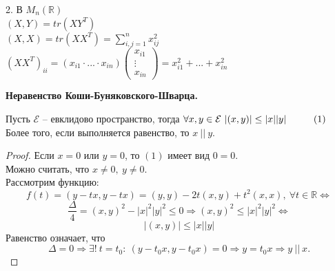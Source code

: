 \documentclass[a4paper, 12pt]{article}
\newcommand\tab[1][.5cm]{\hspace*{#1}}
\theoremstyle{definition}
\begin{document}
    2. В $M_n(\mathbb{R})$\\
    $(X,Y) = tr(XY^T)$\\$(X,X) = tr(XX^T) = \sum\limits_{i,j=1}^
    {n} x_{ij}^2$\\
    $(XX^T)_{ii} = (x_{i1}\cdot...\cdot x_{in})\begin{pmatrix}
        x_{i1}\\\vdots\\x_{in}
    \end{pmatrix} = x_{i1}^2 +...+ x_{in}^2$
    \begin{center}
        \textbf{Неравенство Коши-Буняковского-Шварца.} 
    \end{center}
    Пусть $\mathcal{E}$ -- евклидово пространство, тогда
    $\forall x,y \in \mathcal{E} \ |(x,y)| \leq |x||y|\tab[1cm]
    (1)$\\  
    Более того, если выполняется равенство, то $x\ ||\ y$.
    \begin{proof}
        Если $x = 0 \text{ или } y = 0$, то $(1)$ имеет вид 
        $0 = 0$.\\
        Можно считать, что $x \neq 0,\ y \neq 0$.\\
        Рассмотрим функцию:
        $$f(t) = (y - tx, y - tx) = (y,y) - 2t(x,y) + t^2(x,x),
        \ \forall t \in \mathbb{R} \Longleftrightarrow  $$
        $$\frac{\Delta}{4} = (x,y)^2  - |x|^2|y|^2 \leq 0
        \Longrightarrow (x,y)^2 \leq |x|^2|y|^2 
        \Longleftrightarrow $$
        $$|(x,y)| \leq |x||y|$$
        Равенство означает, что $$\Delta = 0 \Longrightarrow 
        \exists !\ t = t_0:\ (y - t_0x, y - t_0x) = 0
        \Longrightarrow y = t_0x \Longrightarrow y\ ||\ x.$$ 
    \end{proof}
    
\end{document}
